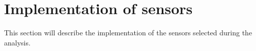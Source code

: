 \section{Implementation of sensors}\label{sub:implementation_of_sensors}
This section will describe the implementation of the sensors selected during the analysis.
